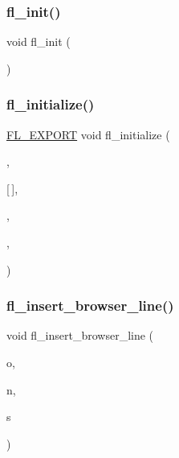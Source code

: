 \mbox{\label{forms_8_h_a7551a12cea666db06a354e71f92b48cf}} 
\subsubsection{\texorpdfstring{fl\+\_\+init()}{fl\_init()}}
{\footnotesize\ttfamily void fl\+\_\+init (\begin{DoxyParamCaption}{ }\end{DoxyParamCaption})\hspace{0.3cm}{\ttfamily [inline]}}

\mbox{\label{forms_8_h_a0241d3135d0904e75a3cb9f3eb26c3b2}} 
\subsubsection{\texorpdfstring{fl\+\_\+initialize()}{fl\_initialize()}}
{\footnotesize\ttfamily \hyperlink{_fl___export_8_h_aa9ba29a18aee9d738370a06eeb4470fc}{F\+L\+\_\+\+E\+X\+P\+O\+RT} void fl\+\_\+initialize (\begin{DoxyParamCaption}\item[{int $\ast$}]{,  }\item[{char $\ast$}]{\mbox{[}$\,$\mbox{]},  }\item[{const char $\ast$}]{,  }\item[{\hyperlink{forms_8_h_adb22a095935258c59cf827f354a57d4e}{F\+L\+\_\+\+C\+M\+D\+\_\+\+O\+PT} $\ast$}]{,  }\item[{int}]{ }\end{DoxyParamCaption})}

\mbox{\label{forms_8_h_a741a27b6f9f7f79f780904140c1cfa30}} 
\subsubsection{\texorpdfstring{fl\+\_\+insert\+\_\+browser\+\_\+line()}{fl\_insert\_browser\_line()}}
{\footnotesize\ttfamily void fl\+\_\+insert\+\_\+browser\+\_\+line (\begin{DoxyParamCaption}\item[{\hyperlink{class_fl___widget}{Fl\+\_\+\+Widget} $\ast$}]{o,  }\item[{int}]{n,  }\item[{const char $\ast$}]{s }\end{DoxyParamCaption})\hspace{0.3cm}{\ttfamily [inline]}}

